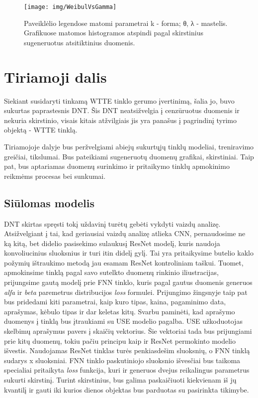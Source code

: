 \documentclass{VUMIFPSkursinis}
\begin{document}
\begin{figure}[H]
  \centering
  \texttt{[image: img/WeibulVsGamma]}
  \caption{  Paveiklėlio legendose matomi parametrai k - forma; θ, λ - mastelis. Grafikuose matomos histogramos atspindi pagal skirstinius sugeneruotus atsitiktinius duomenis. }
  \label{img:WeibulVsGamma}
\end{figure}


\section{Tiriamoji dalis}

Siekiant susidaryti tinkamą WTTE tinklo gerumo įvertinimą, šalia jo, buvo sukurtas paprastesnis DNT. Šis DNT neatsižvelgia į cenzūruotus duomenis ir nekuria skirstinio, visais kitais atžvilgiais jis yra panašus į pagrindinį tyrimo objektą - WTTE tinklą.

Tiriamojoje dalyje bus peržvelgiami abiejų sukurtųjų tinklų modeliai, treniravimo greičiai, tikslumai. Bus pateikiami sugeneruotų duomenų grafikai, skirstiniai. Taip pat, bus aptariamas duomenų surinkimo ir pritaikymo tinklų apmokinimo reikmėms procesas bei sunkumai.


\subsection{Siūlomas modelis}

DNT skirtas spręsti tokį uždavinį turėtų gebėti vykdyti vaizdų analizę. Atsižvelgiant į tai, kad geriausiai vaizdų analizę atlieka CNN, pernaudosime ne ką kitą, bet didelio pasisekimo sulaukusį ResNet modelį, kuris naudoja konvoliucinius sluoksnius ir turi itin didelį gylį. Tai yra pritaikysime butelio kaklo požymių ištraukimo metodą jau esamam ResNet kontroliniam taškui. Tuomet, apmokinsime tinklą pagal savo sutelkto duomenų rinkinio iliustracijas, prijungsime gautą modelį prie FNN tinklo, kuris pagal gautus duomenis generuos \textit{alfa} ir \textit{beta} paremetrus distribucijos \textit{loss} formulei. Prijungimo žingsnyje taip pat bus pridedami kiti parametrai, kaip kuro tipas, kaina, pagaminimo data, aprašymas, kėbulo tipas ir dar keletas kitų. Svarbu paminėti, kad aprašymo duomenys į tinklą bus įtraukiami su USE modelio pagalba. USE užkoduotojas skelbimų aprašymus pavers į skaičių vektorius. Šie vektoriai tada bus prijungiami prie kitų duomenų, tokiu pačiu principu kaip ir ResNet permokinto modelio išvestis. Naudojamas ResNet tinklas turės penkiasdešim sluoksnių, o FNN tinklą sudarys x sluoksniai. FNN tinklo paskutiniojo sluoksnio išvesčiai bus taikoma specialiai pritaikyta \textit{loss} funkcija, kuri ir generuos dvejus reikalingus parametrus sukurti skirstinį. Turint skirstinius, bus galima paskaičiuoti kiekvienam iš jų kvantilį ir gauti iki kurios dienos objektas bus parduotas su pasirinkta tikimybe.
\end{document}
